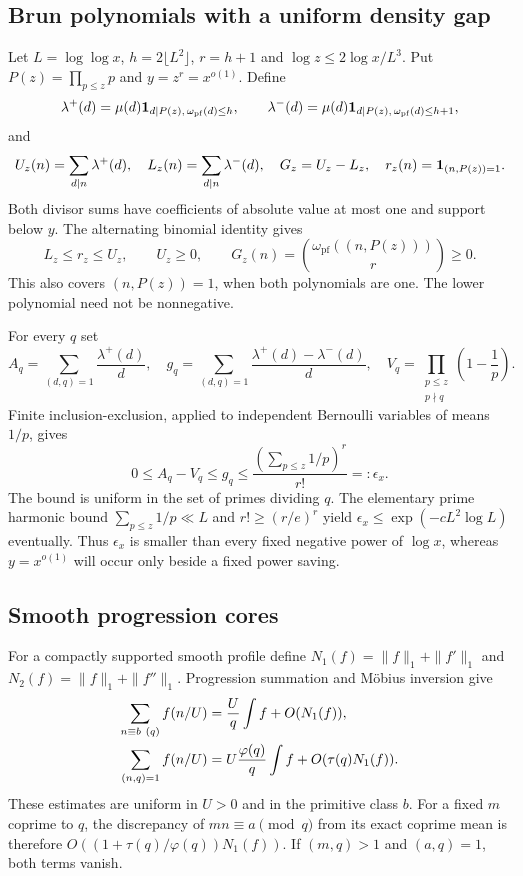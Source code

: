 \subsection{Brun polynomials with a uniform density gap}

Let $L=\log\log x$, $h=2\lfloor L^2\rfloor$, $r=h+1$ and
$\log z\le2\log x/L^3$.  Put $P(z)=\prod_{p\le z}p$ and
$y=z^r=x^{o(1)}$.  Define
\[
 \lambda^+(d)=\mu(d)\mathbf 1_{d\mid P(z),\,\omega_{\mathrm{pf}}(d)\le h},
 \qquad
 \lambda^-(d)=\mu(d)\mathbf 1_{d\mid P(z),\,\omega_{\mathrm{pf}}(d)\le h+1},
\]
and
\[
 U_z(n)=\sum_{d\mid n}\lambda^+(d),\quad
 L_z(n)=\sum_{d\mid n}\lambda^-(d),\quad
 G_z=U_z-L_z,\quad r_z(n)=\mathbf 1_{(n,P(z))=1}.
\]
Both divisor sums have coefficients of absolute value at most one and
support below $y$.  The alternating binomial identity gives
\begin{equation}
 L_z\le r_z\le U_z,\qquad U_z\ge0,\qquad
 G_z(n)=\binom{\omega_{\mathrm{pf}}((n,P(z)))}{r}\ge0.
 \label{coef:Brun-order}
\end{equation}
This also covers $(n,P(z))=1$, when both polynomials are one.
The lower polynomial need not be nonnegative.

For every $q$ set
\[
 A_q=\sum_{(d,q)=1}\frac{\lambda^+(d)}d,\quad
 g_q=\sum_{(d,q)=1}\frac{\lambda^+(d)-\lambda^-(d)}d,\quad
 V_q=\prod_{\substack{p\le z\\p\nmid q}}\left(1-\frac1p\right).
\]
Finite inclusion-exclusion, applied to independent Bernoulli variables
of means $1/p$, gives
\begin{equation}
 0\le A_q-V_q\le g_q
 \le\frac{(\sum_{p\le z}1/p)^r}{r!}=:\epsilon_x.
 \label{coef:Brun-gap}
\end{equation}
The bound is uniform in the set of primes dividing $q$.  The elementary
prime harmonic bound $\sum_{p\le z}1/p\ll L$ and $r!\ge(r/e)^r$ yield
$\epsilon_x\le\exp(-cL^2\log L)$ eventually.  Thus $\epsilon_x$
is smaller than every fixed negative power of $\log x$, whereas
$y=x^{o(1)}$ will occur only beside a fixed power saving.

\subsection{Smooth progression cores}

For a compactly supported smooth profile define
$N_1(f)=\|f\|_1+\|f'\|_1$ and
$N_2(f)=\|f\|_1+\|f''\|_1$.
Progression summation and M\"obius inversion give
\begin{align}
 \sum_{n\equiv b\ (q)}f(n/U)&=\frac Uq\int f+O(N_1(f)),\notag\\
 \sum_{(n,q)=1}f(n/U)&=U\frac{\varphi(q)}q\int f
                        +O(\tau(q)N_1(f)).
 \label{coef:one-core}
\end{align}
These estimates are uniform in $U>0$ and in the primitive class $b$.
For a fixed $m$ coprime to $q$, the discrepancy of $mn\equiv a\pmod q$
from its exact coprime mean is therefore
$O((1+\tau(q)/\varphi(q))N_1(f))$.  If $(m,q)>1$ and $(a,q)=1$,
both terms vanish.

